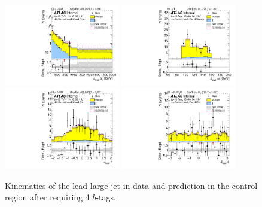 \begin{figure}[htbp!]
\begin{center}
\includegraphics[width=0.45\textwidth,angle=-90]{figures/boosted/Control/b77_FourTag_Control_leadHCand_Pt_m_1.pdf}
\includegraphics[width=0.45\textwidth,angle=-90]{figures/boosted/Control/b77_FourTag_Control_leadHCand_Mass_s.pdf}\\
\includegraphics[width=0.45\textwidth,angle=-90]{figures/boosted/Control/b77_FourTag_Control_leadHCand_Eta.pdf}
\includegraphics[width=0.45\textwidth,angle=-90]{figures/boosted/Control/b77_FourTag_Control_leadHCand_Phi.pdf}
  \caption{Kinematics of the lead large-\R jet in data and prediction in the control region after requiring 4 $b$-tags. }
  \label{fig:boosted-4b-control-ak10-lead}
\end{center}
\end{figure}

